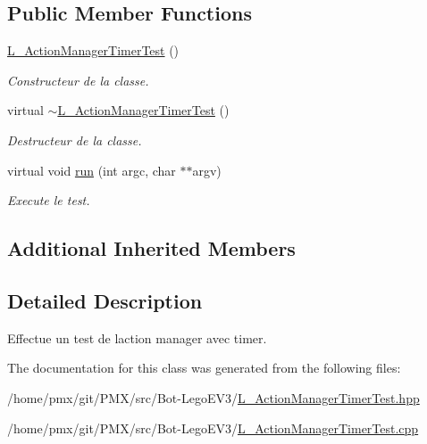 \subsection*{Public Member Functions}
\begin{DoxyCompactItemize}
\item 
\mbox{\label{classL__ActionManagerTimerTest_a8d1689624b62d14df59c61bda31ea0b7}} 
\hyperlink{classL__ActionManagerTimerTest_a8d1689624b62d14df59c61bda31ea0b7}{L\+\_\+\+Action\+Manager\+Timer\+Test} ()
\begin{DoxyCompactList}\small\item\em Constructeur de la classe. \end{DoxyCompactList}\item 
\mbox{\label{classL__ActionManagerTimerTest_a4385d5cd18a0c6a4424fed4a85598177}} 
virtual \hyperlink{classL__ActionManagerTimerTest_a4385d5cd18a0c6a4424fed4a85598177}{$\sim$\+L\+\_\+\+Action\+Manager\+Timer\+Test} ()
\begin{DoxyCompactList}\small\item\em Destructeur de la classe. \end{DoxyCompactList}\item 
\mbox{\label{classL__ActionManagerTimerTest_a8142442fb7b9ed2b09b48bfec2cf49e2}} 
virtual void \hyperlink{classL__ActionManagerTimerTest_a8142442fb7b9ed2b09b48bfec2cf49e2}{run} (int argc, char $\ast$$\ast$argv)
\begin{DoxyCompactList}\small\item\em Execute le test. \end{DoxyCompactList}\end{DoxyCompactItemize}
\subsection*{Additional Inherited Members}


\subsection{Detailed Description}
Effectue un test de l\textquotesingle{}action manager avec timer. 

The documentation for this class was generated from the following files\+:\begin{DoxyCompactItemize}
\item 
/home/pmx/git/\+P\+M\+X/src/\+Bot-\/\+Lego\+E\+V3/\hyperlink{L__ActionManagerTimerTest_8hpp}{L\+\_\+\+Action\+Manager\+Timer\+Test.\+hpp}\item 
/home/pmx/git/\+P\+M\+X/src/\+Bot-\/\+Lego\+E\+V3/\hyperlink{L__ActionManagerTimerTest_8cpp}{L\+\_\+\+Action\+Manager\+Timer\+Test.\+cpp}\end{DoxyCompactItemize}
